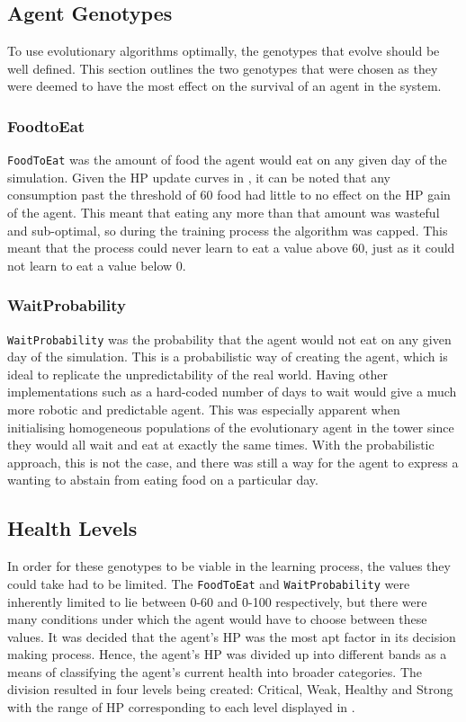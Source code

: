 \subsection{Agent Genotypes}
To use evolutionary algorithms optimally, the genotypes that evolve should be well defined. This section outlines the two genotypes that were chosen as they were deemed to have the most effect on the survival of an agent in the system.

\subsubsection{FoodtoEat}\label{FoodtoEat}
\texttt{FoodToEat} was the amount of food the agent would eat on any given day of the simulation. Given the HP update curves in , it can be noted that any consumption past the threshold of 60 food had little to no effect on the HP gain of the agent. This meant that eating any more than that amount was wasteful and sub-optimal, so during the training process the algorithm was capped. This meant that the process could never learn to eat a value above 60, just as it could not learn to eat a value below 0.

\subsubsection{WaitProbability} \label{waitProbability}
\texttt{WaitProbability} was the probability that the agent would not eat on any given day of the simulation. This is a probabilistic way of creating the agent, which is ideal to replicate the unpredictability of the real world. Having other implementations such as a hard-coded number of days to wait would give a much more robotic and predictable agent. This was especially apparent when initialising homogeneous populations of the evolutionary agent in the tower since they would all wait and eat at exactly the same times. With the probabilistic approach, this is not the case, and there was still a way for the agent to express a wanting to abstain from eating food on a particular day.

\subsection{Health Levels}
In order for these genotypes to be viable in the learning process, the values they could take had to be limited. The \texttt{FoodToEat} and \texttt{WaitProbability} were inherently limited to lie between 0-60 and 0-100 respectively, but there were many conditions under which the agent would have to choose between these values. It was decided that the agent's HP was the most apt factor in its decision making process. Hence, the agent's HP was divided up into different bands as a means of classifying the agent's current health into broader categories. The division resulted in four levels being created: Critical, Weak, Healthy and Strong with the range of HP corresponding to each level displayed in .

